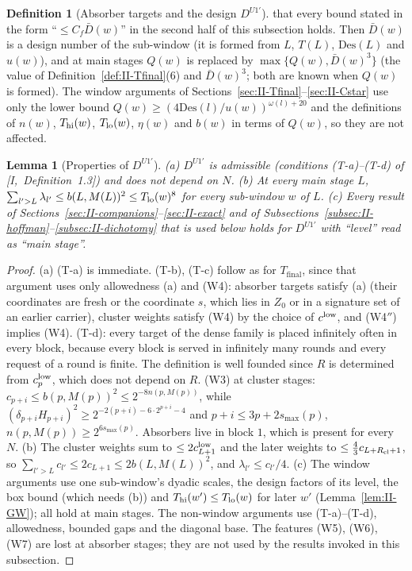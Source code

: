 \documentclass[10pt]{amsart}
\newtheorem{lemma}[theorem]{Lemma}
\theoremstyle{definition}
\newtheorem{definition}[theorem]{Definition}
\theoremstyle{remark}
\begin{document}
\begin{definition}[Absorber targets and the design $D^{U1'}$]
that every bound stated in the form ``$\le C_f\bar D(w)$'' in the second half
of this subsection holds.  Then $\bar D(w)$ is a design number of the
sub-window (it is formed from $L$, $T(L)$, $\mathrm{Des}(L)$ and $u(w)$),
and at main stages $Q(w)$ is replaced by $\max\{Q(w),\bar D(w)^3\}$ (the
value of Definition~\ref{def:II-Tfinal}(6) and $\bar D(w)^3$; both are
known when $Q(w)$ is formed).  The window arguments of
Sections~\ref{sec:II-Tfinal}--\ref{sec:II-Cstar} use only the lower bound
$Q(w)\ge(4\mathrm{Des}(l)/u(w))^{\omega(l)+20}$ and the definitions of $n(w)$,
$T_{\rm hi}(w)$, $T_{\rm lo}(w)$, $\eta(w)$ and $b(w)$ in terms of $Q(w)$,
so they are not affected.
\end{definition}

\begin{lemma}[Properties of $D^{U1'}$]\label{lem:II-DU1}
\textup{(a)} $D^{U1'}$ is admissible \textup{(}conditions \textup{(T-a)}--\textup{(T-d)}
of [I,~Definition~1.3]\textup{)} and does not depend on $N$.
\textup{(b)} At every main stage $L$, $\sum_{l'>L}\lambda_{l'}\le b(L,M(L))^2\le
T_{\rm lo}(w)^8$ for every sub-window $w$ of $L$.
\textup{(c)} Every result of Sections~\ref{sec:II-companions}--\ref{sec:II-exact}
and of Subsections~\ref{subsec:II-hoffman}--\ref{subsec:II-dichotomy} that is used
below holds for $D^{U1'}$ with ``level'' read as ``main stage''.
\end{lemma}

\begin{proof}
(a) (T-a) is immediate.  (T-b), (T-c) follow as for $T_{\mathrm{final}}$, since
that argument uses only allowedness (a) and (W4): absorber targets satisfy
(a) (their coordinates are fresh or the coordinate $s$, which lies in $Z_0$ or
in a signature set of an earlier carrier), cluster weights satisfy (W4) by the
choice of $c^{\rm low}$, and (W4$''$) implies (W4).  (T-d): every target of the
dense family is placed infinitely often in every block, because every block
is served in infinitely many rounds and every request of a round is finite.
The definition is well founded since $R$ is determined from $c^{\rm low}_p$,
which does not depend on $R$.  (W3) at cluster stages: $c_{p+i}\le b(p,M(p))^2\le
2^{-8n(p,M(p))}$, while $(\delta_{p+i}H_{p+i})^2\ge2^{-2(p+i)-6\cdot2^{p+i}-4}$ and
$p+i\le3p+2s_{\max}(p)$, $n(p,M(p))\ge2^{6s_{\max}(p)}$.  Absorbers live in block
$1$, which is present for every $N$.  (b) The cluster weights sum to $\le2c^{\rm
low}_{L+1}$ and the later weights to $\le\frac43c_{L+R_{\rm cl}+1}$, so $\sum_{l'>L}
c_{l'}\le2c_{L+1}\le2b(L,M(L))^2$, and $\lambda_{l'}\le c_{l'}/4$.  (c) The window
arguments use one sub-window's dyadic scales, the design factors of its level,
the box bound (which needs (b)) and $T_{\rm hi}(w')\le T_{\rm lo}(w)$ for later
$w'$ (Lemma~\ref{lem:II-GW}); all hold at main stages.  The non-window
arguments use (T-a)--(T-d), allowedness, bounded gaps and the diagonal base.
The features (W5), (W6), (W7) are lost at absorber stages; they are not used
by the results invoked in this subsection.
\end{proof}
\end{document}
